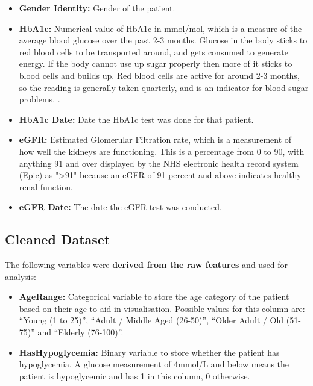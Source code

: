 {\begin{itemize}
        \item \textbf{Gender Identity:} Gender of the patient.
        \item \textbf{HbA1c:} Numerical value of HbA1c in mmol/mol, which is a measure of the average blood glucose over the past 2-3 months. Glucose in the body sticks to red blood cells to be transported around, and gets consumed to generate energy. If the body cannot use up sugar properly then more of it sticks to blood cells and builds up. Red blood cells are active for around 2-3 months, so the reading is generally taken quarterly, and is an indicator for blood sugar problems. \cite{whatishba1c}.  
        \item \textbf{HbA1c Date:} Date the HbA1c test was done for that patient.
        \item \textbf{eGFR:} Estimated Glomerular Filtration rate, which is a measurement of how well the kidneys are functioning. This is a percentage from 0 to 90, with anything 91 and over displayed by the NHS electronic health record system (Epic) as "\textgreater91" because an eGFR of 91 percent and above indicates healthy renal function.
        \item \textbf{eGFR Date:} The date the eGFR test was conducted. 
    \end{itemize}

    \subsection{Cleaned Dataset}
    \vspace{10pt}
    The following variables were \textbf{derived from the raw features} and used for analysis: 
    
    \begin{itemize}
        \item \textbf{Age\textunderscore Range:}  Categorical variable to store the age category of the patient based on their age to aid in visualisation. Possible values for this column are: ``Young (1 to 25)'', ``Adult / Middle Aged (26-50)'', ``Older Adult / Old (51-75)'' and ``Elderly (76-100)''.

        \item \textbf{Has\textunderscore Hypoglycemia:} Binary variable to store whether the patient has hypoglycemia. A glucose measurement of 4mmol/L and below means the patient is hypoglycemic and has 1 in this column, 0 otherwise. 


\end{itemize}}
